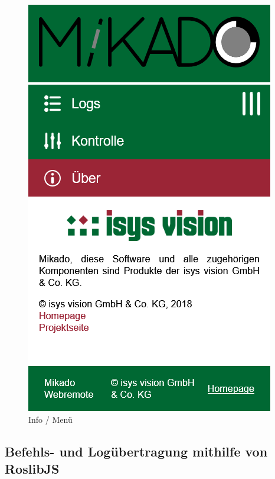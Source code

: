 \begin{figure}[H]
\begin{center}
\begin{minipage}{0.3\textwidth}
			\includegraphics[width=\textwidth]{media/webremote-info.png}
			\caption{Info / Menü}
			\label{fig:webtools-remote-design-info}
		\end{minipage}
	\end{center}
\end{figure}


\subsection{Befehls- und Logübertragung mithilfe von RoslibJS}
\label{subsec:webtools-remote-rosjs}

